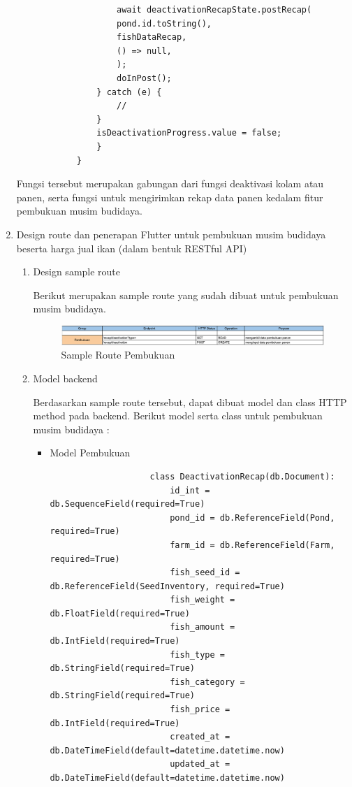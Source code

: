 \begin{spacing}{1.5}
\begin{enumerate}
\begin{lstlisting}
					await deactivationRecapState.postRecap(
					pond.id.toString(),
					fishDataRecap,
					() => null,
					);
					doInPost();
				} catch (e) {
					//
				}
				isDeactivationProgress.value = false;
				}
			}
		\end{lstlisting}

		Fungsi tersebut merupakan gabungan dari fungsi deaktivasi kolam atau panen, serta fungsi untuk mengirimkan rekap data panen kedalam fitur pembukuan musim budidaya. 

		\item Design route dan penerapan Flutter untuk pembukuan musim budidaya beserta harga jual ikan (dalam bentuk RESTful API) 
		
		\begin{enumerate}
			\item Design sample route
						
			Berikut merupakan sample route yang sudah dibuat untuk pembukuan musim budidaya.

			\begin{figure}[H]
				\centering
				\includegraphics[width=1\textwidth]{gambar/sprint5/pembukuan_route.png}
				\caption{Sample Route Pembukuan}
			\end{figure}

			\item Model backend

			Berdasarkan sample route tersebut, dapat dibuat model dan class HTTP method pada backend. Berikut model serta class untuk pembukuan musim budidaya :

			\begin{itemize}
				\item Model Pembukuan
				
				\begin{lstlisting}
					class DeactivationRecap(db.Document):
						id_int = db.SequenceField(required=True)
						pond_id = db.ReferenceField(Pond, required=True)
						farm_id = db.ReferenceField(Farm, required=True)
						fish_seed_id = db.ReferenceField(SeedInventory, required=True)
						fish_weight = db.FloatField(required=True)
						fish_amount = db.IntField(required=True)
						fish_type = db.StringField(required=True)
						fish_category = db.StringField(required=True)
						fish_price = db.IntField(required=True)
						created_at = db.DateTimeField(default=datetime.datetime.now)
						updated_at = db.DateTimeField(default=datetime.datetime.now)
				\end{lstlisting}
			\end{itemize}


\end{enumerate}
\end{enumerate}
\end{spacing}
